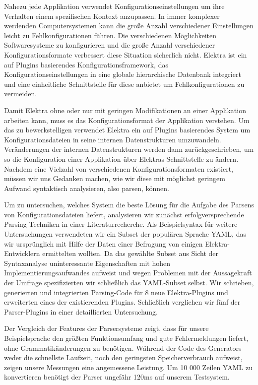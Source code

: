 \begin{kurzfassung}
\begin{sloppypar}
Nahezu jede Applikation verwendet Konfigurationseinstellungen um ihre Verhalten einem spezifischen Kontext anzupassen. In immer komplexer werdenden Computersystemen kann die große Anzahl verschiedener Einstellungen leicht zu Fehlkonfigurationen führen. Die verschiedenen Möglichkeiten Softwaresysteme zu konfigurieren und die große Anzahl verschiedener Konfigurationsformate verbessert diese Situation sicherlich nicht. Elektra ist ein auf Plugins basierendes Konfigurationsframework, das Konfigurationseinstellungen in eine globale hierarchische Datenbank integriert und eine einheitliche Schnittstelle für diese anbietet um Fehlkonfigurationen zu vermeiden.
\end{sloppypar}

Damit Elektra ohne oder nur mit geringen Modifikationen an einer Applikation arbeiten kann, muss es das Konfigurationsformat der Applikation verstehen. Um das zu bewerkstelligen verwendet Elektra ein auf Plugins basierendes System um Konfigurationsdateien in seine internen Datenstrukturen umzuwandeln. Veränderungen der internen Datenstrukturen werden dann zurückgeschrieben, um so die Konfiguration einer Applikation über Elektras Schnittstelle zu ändern. Nachdem eine Vielzahl von verschiedenen Konfigurationsformaten existiert, müssen wir uns Gedanken machen, wie wir diese mit möglichst geringem Aufwand syntaktisch analysieren, also parsen, können.

Um zu untersuchen, welches System die beste Lösung für die Aufgabe des Parsens von Konfigurationsdateien liefert, analysieren wir zunächst erfolgversprechende Parsing-Techniken in einer Literaturrecherche. Als Beispielsyntax für weitere Untersuchungen verwendeten wir ein Subset der populären Sprache YAML, das wir ursprünglich mit Hilfe der Daten einer Befragung von einigen Elektra-Entwicklern ermittelten wollten. Da das gewählte Subset aus Sicht der Syntaxanalyse uninteressante Eigenschaften mit hohen Implementierungsaufwandes aufweist und wegen Problemen mit der Aussagekraft der Umfrage spezifizierten wir schließlich das YAML-Subset selbst. Wir schrieben, generierten und integrierten Parsing-Code für 8 neue Elektra-Plugins und erweiterten eines der existierenden Plugins. Schließlich verglichen wir fünf der Parser-Plugins in einer detaillierten Untersuchung.

Der Vergleich der Features der Parsersysteme zeigt, dass für unsere Beispielsprache  den größten Funktionsumfang und gute Fehlermeldungen liefert, ohne Grammatikänderungen zu benötigen. Während der Code des Generators weder die schnellste Laufzeit, noch den geringsten Speicherverbrauch aufweist, zeigen unsere Messungen eine angemessene Leistung. Um 10 000 Zeilen YAML zu konvertieren benötigt der Parser ungefähr 120ms auf unserem Testsystem.
\end{kurzfassung}
